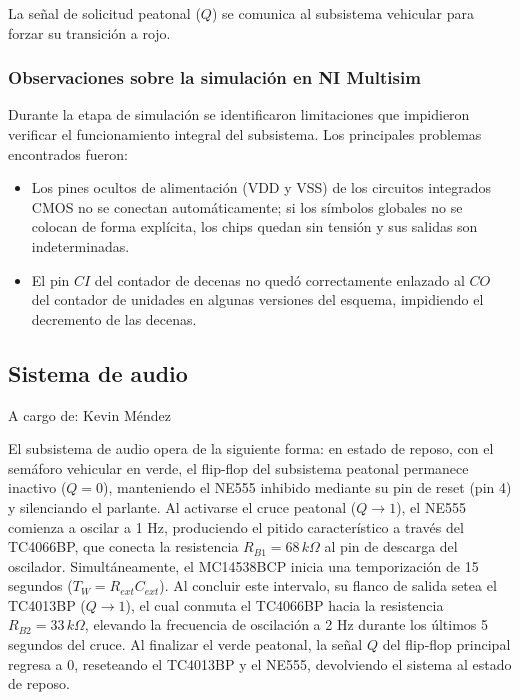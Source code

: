 \documentclass[journal]{IEEEtran}
\begin{document}
La señal de solicitud peatonal ($Q$) se comunica al subsistema vehicular para forzar su
transición a rojo.

\subsubsection{Observaciones sobre la simulación en NI Multisim}

Durante la etapa de simulación se identificaron limitaciones que impidieron verificar el
funcionamiento integral del subsistema. Los principales problemas encontrados fueron:

\begin{itemize}
    \item Los pines ocultos de alimentación (VDD y VSS) de los circuitos integrados CMOS
          no se conectan automáticamente; si los símbolos globales no se colocan de forma
          explícita, los chips quedan sin tensión y sus salidas son indeterminadas.
    \item El pin $CI$ del contador de decenas no quedó correctamente enlazado al $CO$ del
          contador de unidades en algunas versiones del esquema, impidiendo el decremento
          de las decenas.
\end{itemize}

\subsection{Sistema de audio}
A cargo de: Kevin Méndez

El subsistema de audio opera de la siguiente forma: en estado de reposo, 
con el semáforo vehicular en verde, el flip-flop del subsistema peatonal 
permanece inactivo ($Q = 0$), manteniendo el NE555 inhibido mediante su 
pin de reset (pin 4) y silenciando el parlante. Al activarse el cruce 
peatonal ($Q \rightarrow 1$), el NE555 comienza a oscilar a 1 Hz, 
produciendo el pitido característico a través del TC4066BP, que conecta 
la resistencia $R_{B1} = 68\,k\Omega$ al pin de descarga del oscilador. 
Simultáneamente, el MC14538BCP inicia una temporización de 15 segundos 
($T_W = R_{ext}C_{ext}$). Al concluir este intervalo, su flanco de salida 
setea el TC4013BP ($Q \rightarrow 1$), el cual conmuta el TC4066BP hacia 
la resistencia $R_{B2} = 33\,k\Omega$, elevando la frecuencia de 
oscilación a 2 Hz durante los últimos 5 segundos del cruce. Al finalizar 
el verde peatonal, la señal $Q$ del flip-flop principal regresa a 0, 
reseteando el TC4013BP y el NE555, devolviendo el sistema al estado de 
reposo.
\end{document}
